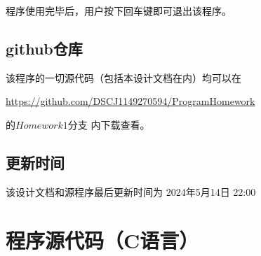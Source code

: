 \documentclass[withoutpreface,bwprint]{cumcmthesis}  %
\begin{document}
		程序使用完毕后，用户按下回车键即可退出该程序。
		
		\subsection{github仓库}
		该程序的一切源代码（包括本设计文档在内）均可以在
		
		\url{https://github.com/DSCJ1149270594/ProgramHomework} 
		
		的$ Homework1$分支 内下载查看。
		\subsection{更新时间}
		该设计文档和源程序最后更新时间为 2024年5月14日 22:00
		
		\section{程序源代码（C语言）}
\end{document}
